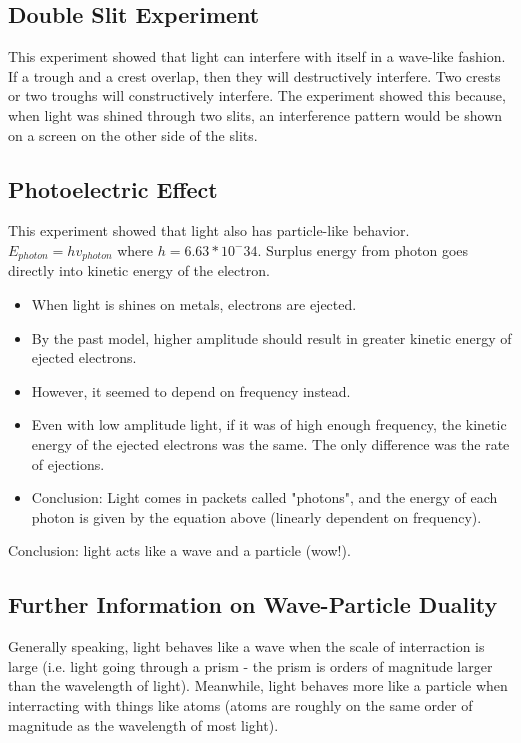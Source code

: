 \documentclass[a4paper,12pt]{report}
\begin{document}
\subsection{Double Slit Experiment}
This experiment showed that light can interfere with itself in a wave-like fashion. If a trough and a crest overlap, then they will destructively interfere. Two crests or two troughs will constructively interfere.
The experiment showed this because, when light was shined through two slits, an interference pattern would be shown on a screen on the other side of the slits.

\subsection{Photoelectric Effect}
This experiment showed that light also has particle-like behavior. $E_{photon} = hv_{photon}$ where $h = 6.63*10^-34$. Surplus energy from photon goes directly into kinetic energy of the electron.
\begin{itemize}
\item When light is shines on metals, electrons are ejected.
\item By the past model, higher amplitude should result in greater kinetic energy of ejected electrons.
\item However, it seemed to depend on frequency instead.
\item Even with low amplitude light, if it was of high enough frequency, the kinetic energy of the ejected electrons was the same. The only difference was the rate of ejections.
\item Conclusion: Light comes in packets called "photons", and the energy of each photon is given by the equation above (linearly dependent on frequency). 
\end{itemize}
Conclusion: light acts like a wave and a particle (wow!).

\subsection{Further Information on Wave-Particle Duality}
Generally speaking, light behaves like a wave when the scale of interraction is large (i.e. light going through a prism - the prism is orders of magnitude larger than the wavelength of light). Meanwhile, light behaves more like a particle when interracting with things like atoms (atoms are roughly on the same order of magnitude as the wavelength of most light).
\end{document}
